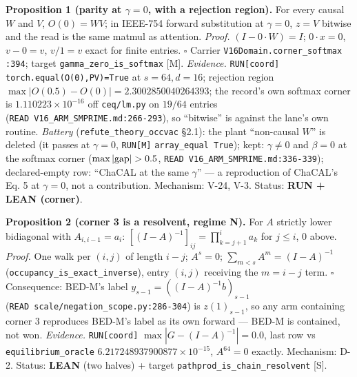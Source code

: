 \documentclass[11pt,a4paper]{article}
\theoremstyle{plain}
\theoremstyle{definition}
\theoremstyle{remark}
\begin{document}
\textbf{Proposition 1 (parity at \(\gamma=0\), with a rejection
region).} For every causal \(W\) and \(V\), \(O(0)=WV\); in IEEE-754
forward substitution at \(\gamma=0\), \(z=V\) bitwise and the read is
the same matmul as attention. \emph{Proof.} \((I-0\cdot W)=I\);
\(0\cdot x=0\), \(v-0=v\), \(v/1=v\) exact for finite entries.
\(\square\) Carrier \texttt{V16Domain.corner\_softmax} \texttt{:394};
target \texttt{gamma\_zero\_is\_softmax} {[}M{]}. \emph{Evidence.}
\texttt{RUN{[}coord{]}} \texttt{torch.equal(O(0),PV)=True} at
\(s=64,d=16\); rejection region
\(\max|O(0.5)-O(0)|=2.3002850040264393\); the record's own softmax
corner is \(1.110223\times10^{-16}\) off \texttt{ceq/lm.py} on \(19/64\)
entries (\texttt{READ\ V16\_ARM\_SMPRIME.md:266-293}), so ``bitwise'' is
against the lane's own routine. \emph{Battery}
(\texttt{refute\_theory\_occvac} §2.1): the plant ``non-causal \(W\)''
is deleted (it passes at \(\gamma=0\), \texttt{RUN{[}M{]}}
\texttt{array\_equal\ True}); kept: \(\gamma\ne0\) and \(\beta=0\) at
the softmax corner (\(\max|{\rm gap}|>0.5\),
\texttt{READ\ V16\_ARM\_SMPRIME.md:336-339}); declared-empty row:
``ChaCAL at the same \(\gamma\)'' --- a reproduction of ChaCAL's Eq. 5
at \(\gamma=0\), not a contribution. Mechanism: V-24, V-3. Status:
\textbf{RUN + LEAN (corner)}.

\textbf{Proposition 2 (corner 3 is a resolvent, regime N).} For \(A\)
strictly lower bidiagonal with \(A_{i,i-1}=a_i\):
\([(I-A)^{-1}]_{ij}=\prod_{k=j+1}^{i}a_k\) for \(j\le i\), \(0\) above.
\emph{Proof.} One walk per \((i,j)\) of length \(i-j\); \(A^s=0\);
\(\sum_{m<s}A^m=(I-A)^{-1}\) (\texttt{occupancy\_is\_exact\_inverse}),
entry \((i,j)\) receiving the \(m=i-j\) term. \(\square\) Consequence:
BED-M's label \(y_{s-1}=((I-A)^{-1}b)_{s-1}\)
(\texttt{READ\ scale/negation\_scope.py:286-304}) is \(z(1)_{s-1}\), so
any arm containing corner 3 reproduces BED-M's label as its own forward
--- BED-M is contained, not won. \emph{Evidence.}
\texttt{RUN{[}coord{]}} \(\max|G-(I-A)^{-1}|=0.0\), last row vs
\texttt{equilibrium\_oracle} \(6.217248937900877\times10^{-15}\),
\(A^{64}=0\) exactly. Mechanism: D-2. Status: \textbf{LEAN} (two halves)
+ target \texttt{pathprod\_is\_chain\_resolvent} {[}S{]}.
\end{document}
